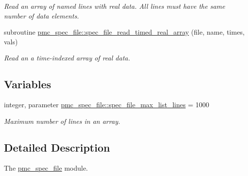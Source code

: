 \begin{DoxyCompactItemize}
\begin{DoxyCompactList}\small\item\em Read an array of named lines with real data. All lines must have the same number of data elements. \end{DoxyCompactList}\item 
subroutine \mbox{\hyperlink{namespacepmc__spec__file_a6b4270f4f50e810affcab6aecd42e867}{pmc\+\_\+spec\+\_\+file\+::spec\+\_\+file\+\_\+read\+\_\+timed\+\_\+real\+\_\+array}} (file, name, times, vals)
\begin{DoxyCompactList}\small\item\em Read an a time-\/indexed array of real data. \end{DoxyCompactList}\end{DoxyCompactItemize}
\subsection*{Variables}
\begin{DoxyCompactItemize}
\item 
integer, parameter \mbox{\hyperlink{namespacepmc__spec__file_a5297f39208d828141ed9b268484360a5}{pmc\+\_\+spec\+\_\+file\+::spec\+\_\+file\+\_\+max\+\_\+list\+\_\+lines}} = 1000
\begin{DoxyCompactList}\small\item\em Maximum number of lines in an array. \end{DoxyCompactList}\end{DoxyCompactItemize}


\subsection{Detailed Description}
The \mbox{\hyperlink{namespacepmc__spec__file}{pmc\+\_\+spec\+\_\+file}} module. 

